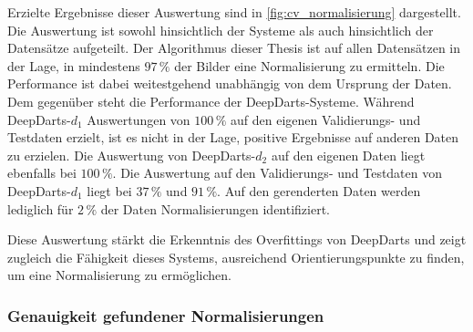 Erzielte Ergebnisse dieser Auswertung sind in \autoref{fig:cv_normalisierung} dargestellt. Die Auswertung ist sowohl hinsichtlich der Systeme als auch hinsichtlich der Datensätze aufgeteilt. Der Algorithmus dieser Thesis ist auf allen Datensätzen in der Lage, in mindestens $97\,\%$ der Bilder eine Normalisierung zu ermitteln. Die Performance ist dabei weitestgehend unabhängig von dem Ursprung der Daten. Dem gegenüber steht die Performance der DeepDarts-Systeme. Während DeepDarts-$d_1$ Auswertungen von $100\,\%$ auf den eigenen Validierungs- und Testdaten erzielt, ist es nicht in der Lage, positive Ergebnisse auf anderen Daten zu erzielen. Die Auswertung von DeepDarts-$d_2$ auf den eigenen Daten liegt ebenfalls bei $100\,\%$. Die Auswertung auf den Validierungs- und Testdaten von DeepDarts-$d_1$ liegt bei $37\,\%$ und $91\,\%$. Auf den gerenderten Daten werden lediglich für $2\,\%$ der Daten Normalisierungen identifiziert.

Diese Auswertung stärkt die Erkenntnis des Overfittings von DeepDarts und zeigt zugleich die Fähigkeit dieses Systems, ausreichend Orientierungspunkte zu finden, um eine Normalisierung zu ermöglichen.

\subsubsection{Genauigkeit gefundener Normalisierungen} %
\label{sec:genauigkeit_normalisierung}

\Similarities


